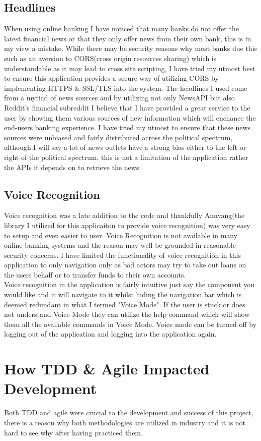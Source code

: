 \subsection{Headlines}
When using online banking I have noticed that many banks do not offer the latest financial news or that they only offer news from their own bank, this is in my view a mistake.  While there may be security reasons why most banks due this such as an aversion to CORS(cross origin resources sharing) which is understandable as it may lead to cross site scripting,  I have tried my utmost best to ensure this application provides a secure way of utilizing CORS by implementing HTTPS \& SSL/TLS into the system.  The headlines I used come from a myriad of news sources and by utilizing not only NewsAPI but also Reddit's financial subreddit I believe that I have provided a great service to the user by showing them various sources of new information which will enchance the end-users banking experience.  I have tried my utmost to ensure that these news sources were unbiased and fairly distributed across the political spectrum, although I will say a lot of news outlets have a strong bias either to the left or right of the political spectrum, this is not a limitation of the application rather the APIs it depends on to retrieve the news.
\subsection{Voice Recognition}
Voice recognition was a late addition to the code and thankfully Annyang(the library I utilized for this applicaiton to provide voice recognition)\cite{Annyang} was very easy to setup and even easier to user.  Voice Recognition is not available in many online banking systems and the reason may well be grounded in reasonable security concerns.  I have limited the functionality of voice recognition in this application to only navigation only as bad actors may try to take out loans on the users behalf or to transfer funds to their own accounts.
\\
Voice recognition in the application is fairly intuitive just say the component you would like and it will navigate to it whilst hiding the navigation bar which is deemed redundant in what I termed "Voice Mode".  If the user is stuck or does not understand Voice Mode they can utilize the help command which will show them all the available commands in Voice Mode. Voice mode can be turned off by logging out of the application and logging into the application again.
\section{How TDD \& Agile Impacted Development}
Both TDD and agile were crucial to the development and success of this project, there is a reason why both methodologies are utilized in industry and it is not hard to see why after having practiced them.

